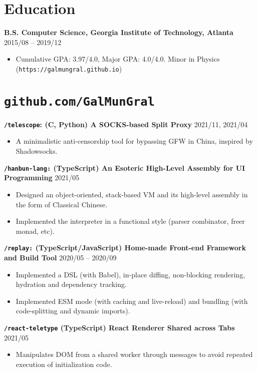 \documentclass[9pt]{article}
\begin{document}
\section*{Education}
\textbf{B.S. Computer Science, Georgia Institute of Technology, Atlanta} \hfill 2015/08 -- 2019/12
\begin{itemize}
\item  Cumulative GPA: 3.97/4.0, Major GPA: 4.0/4.0. Minor in Physics (\texttt{https://galmungral.github.io})
\end{itemize} 

\section*{\texttt{\large github.com/GalMunGral}}

\textbf{\texttt{/telescope}:  (C, Python) A SOCKS-based Split Proxy }   \hfill 2021/11, 2021/04
\begin{itemize}
\item A minimalistic anti-censorship tool for bypassing GFW in China, inspired by Shadowsocks.
\end{itemize}

\vspace{0.5em}
\textbf{\texttt{/hanbun-lang:} (TypeScript) An Esoteric High-Level Assembly for UI Programming} \hfill 2021/05
\begin{itemize}
\item Designed an object-oriented, stack-based VM and its high-level assembly in the form of Classical Chinese.
\item Implemented the interpreter in a functional style (parser combinator, freer monad, etc).
\end{itemize}

\vspace{0.5em}
\textbf{\texttt{/replay:} (TypeScript/JavaScript) Home-made Front-end Framework and Build Tool} \hfill 2020/05 -- 2020/09
\begin{itemize}
\item Implemented a DSL (with Babel), in-place diffing, non-blocking rendering, hydration and dependency tracking.
\item Implemented ESM mode (with caching and live-reload) and bundling (with code-splitting and dynamic imports).
\end{itemize}

\vspace{0.5em}
\textbf{\texttt{/react-teletype}  (TypeScript) React Renderer Shared across Tabs} \hfill 2021/05 
\begin{itemize}
\item  Manipulates DOM from a shared worker through messages to avoid repeated execution of initialization code.
\end{itemize}
\end{document}
